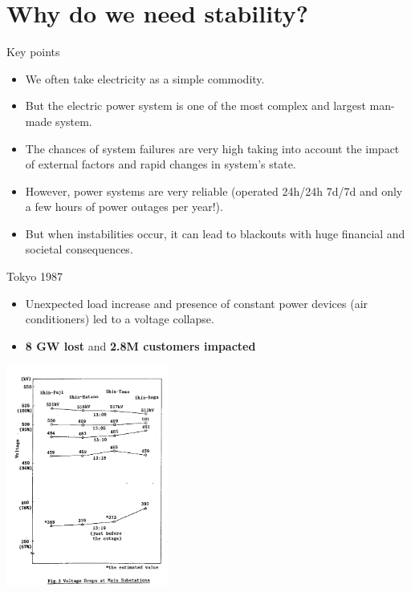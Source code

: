 \section{Why do we need stability?}

\begin{frame} {Key points}
\begin{itemize}
    \item We often take electricity as a simple commodity.
    \item But the electric power system is one of the most complex and largest man-made system.
    \item The chances of system failures are very high taking into account the impact of external factors and rapid changes in system's state.
    \item However, power systems are very reliable (operated 24h/24h 7d/7d and only a few hours of power outages per year!).
    \item But when instabilities occur, it can lead to blackouts with huge financial and societal consequences.
\end{itemize}
\end{frame}

\begin{frame}[allowframebreaks]{Tokyo 1987}
\begin{itemize}
    \item Unexpected load increase and presence of constant power devices (air conditioners) led to a voltage collapse.
    \item \textbf{8 GW lost} and \textbf{2.8M customers impacted} \cite{ohno20061987, kurita1988power}
\end{itemize}

\begin{center}
\includegraphics[width=0.4\textwidth]{images/TokyoCollapse.png}
\end{center}
\end{frame}

